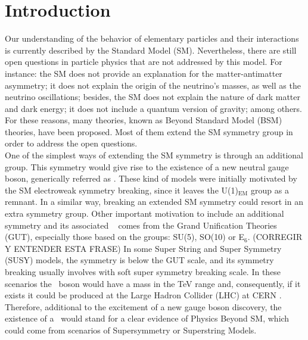 \chapter*{Introduction}

Our understanding of the behavior of elementary particles and their interactions is 
currently described by the Standard Model (SM). Nevertheless, there are still open 
questions in particle physics that are not addressed by this model. For instance: the SM does 
not provide an explanation for the matter-antimatter asymmetry; it does not 
explain the origin of the neutrino's masses, as well as the 
neutrino oscillations; besides, the SM does not explain the nature of dark matter and dark energy;
it does not include a quantum version of gravity; among others. For these reasons, 
many theories, known as Beyond Standard Model (BSM) \cite{BSM} theories, have been proposed.
Most of them extend the SM symmetry group in order to address the open questions. \\

One of the simplest ways of extending the SM symmetry is through an additional
\Uprime group. This symmetry would give rise to the existence of a 
new neutral gauge boson, generically referred as \Zprime. These kind of models were initially 
motivated by the SM electroweak symmetry breaking, since it leaves the U(1)$_{\text{EM}}$ group as a remnant. In a similar way, breaking 
an extended SM symmetry could resort in an extra \Uprime symmetry group. Other 
important motivation to include an additional \Uprime symmetry and its associated 
\Zprime~ comes from the Grand Unification Theories (GUT), especially those 
based on the groups: SU(5), SO(10) or E$_{6}$. (CORREGIR Y ENTENDER ESTA FRASE) In some Super 
String and Super Symmetry (SUSY) models, the \Uprime symmetry is 
below the GUT scale, and its symmetry breaking usually 
involves with soft super symmetry breaking scale. 
In these scenarios the \Zprime~boson would have a mass in the TeV range and, consequently, if it exists it
could be produced at the Large Hadron Collider (LHC) at CERN \cite{Langacker:2008yv}. Therefore, additional to
the excitement of a new gauge boson discovery, the existence of a \Zprime~would stand for a clear 
evidence of Physics Beyond SM, which could come from scenarios of Supersymmetry or Superstring Models. \\
  
